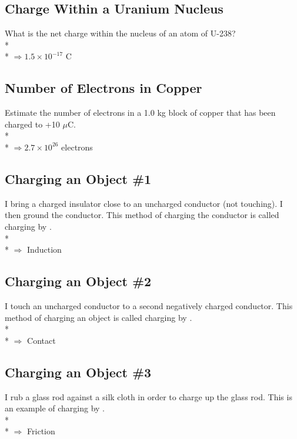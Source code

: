 \documentclass[11pt]{article}
\begin{document}
\subsection{Charge Within a Uranium Nucleus}
What is the net charge within the nucleus of an atom of U-238? \\* \\*
$\Rightarrow 1.5 \times 10^{-17}$ C

\subsection{Number of Electrons in Copper}
Estimate the number of electrons in a 1.0 kg block of copper that has been charged to +10 $\mu$C. \\* \\*
$\Rightarrow 2.7 \times 10^{26}$ electrons

\subsection{Charging an Object \#1}
I bring a charged insulator close to an uncharged conductor (not touching).  I then ground the conductor.  This method of charging the conductor is called charging by \underline{\hspace{1cm}}. \\* \\*
$\Rightarrow$ Induction

\subsection{Charging an Object \#2}
I touch an uncharged conductor to a second negatively charged conductor.  This method of charging an object is called charging by \underline{\hspace{1cm}}. \\* \\*
$\Rightarrow$ Contact

\subsection{Charging an Object \#3}
I rub a glass rod against a silk cloth in order to charge up the glass rod.  This is an example of charging by \underline{\hspace{1cm}}. \\* \\*
$\Rightarrow$ Friction

\end{document}
